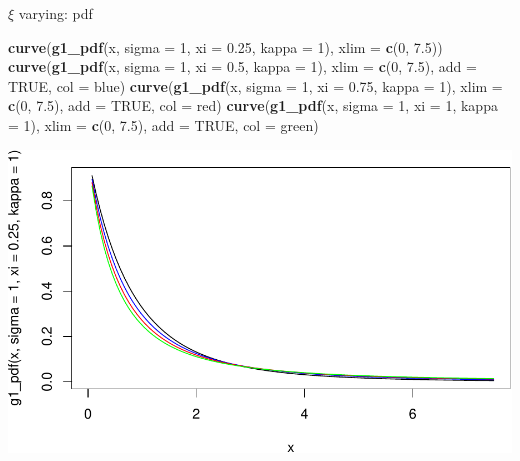 \documentclass[
]{article}
\newenvironment{Shaded}{\begin{snugshade}}{\end{snugshade}}
\newcommand{\AttributeTok}[1]{\textcolor[rgb]{0.13,0.29,0.53}{#1}}
\newcommand{\ConstantTok}[1]{\textcolor[rgb]{0.56,0.35,0.01}{#1}}
\newcommand{\DecValTok}[1]{\textcolor[rgb]{0.00,0.00,0.81}{#1}}
\newcommand{\FloatTok}[1]{\textcolor[rgb]{0.00,0.00,0.81}{#1}}
\newcommand{\FunctionTok}[1]{\textcolor[rgb]{0.13,0.29,0.53}{\textbf{#1}}}
\newcommand{\NormalTok}[1]{#1}
\newcommand{\StringTok}[1]{\textcolor[rgb]{0.31,0.60,0.02}{#1}}
\begin{document}
\(\xi\) varying: pdf

\begin{Shaded}
\begin{Highlighting}[]
\FunctionTok{curve}\NormalTok{(}\FunctionTok{g1\_pdf}\NormalTok{(x, }\AttributeTok{sigma =} \DecValTok{1}\NormalTok{, }\AttributeTok{xi =} \FloatTok{0.25}\NormalTok{, }\AttributeTok{kappa =} \DecValTok{1}\NormalTok{), }\AttributeTok{xlim =} \FunctionTok{c}\NormalTok{(}\DecValTok{0}\NormalTok{, }\FloatTok{7.5}\NormalTok{))}
\FunctionTok{curve}\NormalTok{(}\FunctionTok{g1\_pdf}\NormalTok{(x, }\AttributeTok{sigma =} \DecValTok{1}\NormalTok{, }\AttributeTok{xi =} \FloatTok{0.5}\NormalTok{, }\AttributeTok{kappa =} \DecValTok{1}\NormalTok{), }\AttributeTok{xlim =} \FunctionTok{c}\NormalTok{(}\DecValTok{0}\NormalTok{, }\FloatTok{7.5}\NormalTok{), }\AttributeTok{add =} \ConstantTok{TRUE}\NormalTok{, }\AttributeTok{col =} \StringTok{\textquotesingle{}blue\textquotesingle{}}\NormalTok{)}
\FunctionTok{curve}\NormalTok{(}\FunctionTok{g1\_pdf}\NormalTok{(x, }\AttributeTok{sigma =} \DecValTok{1}\NormalTok{, }\AttributeTok{xi =} \FloatTok{0.75}\NormalTok{, }\AttributeTok{kappa =} \DecValTok{1}\NormalTok{), }\AttributeTok{xlim =} \FunctionTok{c}\NormalTok{(}\DecValTok{0}\NormalTok{, }\FloatTok{7.5}\NormalTok{), }\AttributeTok{add =} \ConstantTok{TRUE}\NormalTok{, }\AttributeTok{col =} \StringTok{\textquotesingle{}red\textquotesingle{}}\NormalTok{)}
\FunctionTok{curve}\NormalTok{(}\FunctionTok{g1\_pdf}\NormalTok{(x, }\AttributeTok{sigma =} \DecValTok{1}\NormalTok{, }\AttributeTok{xi =} \DecValTok{1}\NormalTok{, }\AttributeTok{kappa =} \DecValTok{1}\NormalTok{), }\AttributeTok{xlim =} \FunctionTok{c}\NormalTok{(}\DecValTok{0}\NormalTok{, }\FloatTok{7.5}\NormalTok{), }\AttributeTok{add =} \ConstantTok{TRUE}\NormalTok{, }\AttributeTok{col =} \StringTok{\textquotesingle{}green\textquotesingle{}}\NormalTok{)}
\end{Highlighting}
\end{Shaded}

\begin{center}\includegraphics[width=0.8\linewidth]{g1_varying_params_files/figure-latex/unnamed-chunk-6-1} \end{center}
\end{document}
